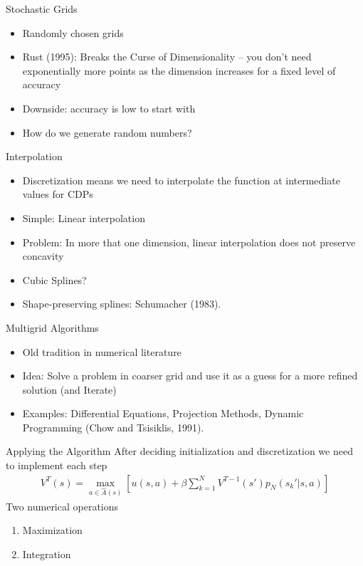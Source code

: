 \documentclass[xcolor=pdftex,dvipsnames,table,mathserif,aspectratio=169]{beamer}
\begin{document}
\begin{frame}{Stochastic Grids}
\begin{itemize}
\item Randomly chosen grids
\item Rust (1995): Breaks the Curse of Dimensionality -- you don't need exponentially more points as the dimension increases for a fixed level of accuracy
\item Downside: accuracy is low to start with
\item How do we generate random numbers?
\end{itemize}
\end{frame}

\begin{frame}{Interpolation}
\begin{itemize}
\item Discretization means we need to interpolate the function at intermediate values for CDPs
\item Simple: Linear interpolation
\item Problem: In more that one dimension, linear interpolation does not preserve concavity
\item Cubic Splines?
\item Shape-preserving splines: Schumacher (1983).
\end{itemize}
\end{frame}

\begin{frame}{Multigrid Algorithms}
\begin{itemize}
\item Old tradition in numerical literature
\item Idea: Solve a problem in coarser grid and use it as a guess for a more refined solution (and Iterate)
\item Examples: Differential Equations, Projection Methods, Dynamic Programming (Chow and Tsisiklis, 1991).
\end{itemize}
\end{frame}

\begin{frame}{Applying the Algorithm}
After deciding initialization and discretization we need to implement each step
\begin{eqnarray*}
V^T(s) = \max_{a \in \hat{A}(s)} \left[  u(s,a) + \beta \sum_{k=1}^N V^{T-1}(s')p_N (s_k' | s,a) \right]
\end{eqnarray*}
Two numerical operations
\begin{enumerate}
\item Maximization
\item Integration
\end{enumerate}
\end{frame}
\end{document}
